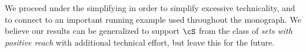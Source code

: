 \documentclass[../../book-main.tex]{subfiles}
\begin{document}
We proceed under the simplifying  in order to
simplify excessive technicality, and to connect to an important running example
used throughout the monograph. We believe our results can be generalized to
support $\cS$ from the class of \textit{sets with positive reach} with
additional technical effort, but leave this for the future.

%
%
%
%
\end{document}
